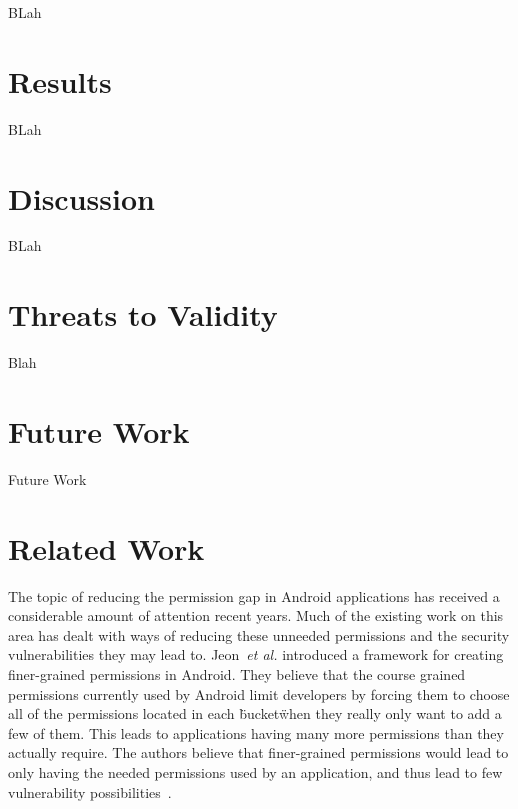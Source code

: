 \documentclass{sig-alternate}
\begin{document}
BLah




\section{Results}

BLah




\section{Discussion}




BLah


\section{Threats to Validity}
 Blah



\section{Future Work}
\label{sec: futurework}
Future Work




\section{Related Work}
\label{sec: relatedwork}

The topic of reducing the permission gap in Android applications has received a considerable amount of attention recent years. Much of the existing work on this area has dealt with ways of reducing these unneeded permissions and the security vulnerabilities they may lead to. Jeon~\emph{et al.} introduced a framework for creating finer-grained permissions in Android. They believe that the course grained permissions currently used by Android limit developers by forcing them to choose all of the permissions located in each \"bucket\" when they really only want to add a few of them. This leads to applications having many more permissions than they actually require. The authors believe that finer-grained permissions would lead to only having the needed permissions used by an application, and thus lead to few vulnerability possibilities~\cite{jeon2011dr}.
\end{document}
